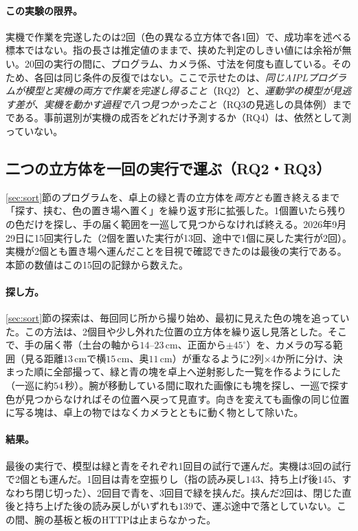 \documentclass[10pt,letterpaper]{article}
\begin{document}
\paragraph{この実験の限界。}実機で作業を完遂したのは2回（色の異なる立方体で各1回）で、成功率を述べる標本ではない。指の長さは推定値のままで、挟めた判定のしきい値には余裕が無い。20回の実行の間に、プログラム、カメラ係、寸法を何度も直している。そのため、各回は同じ条件の反復ではない。ここで示せたのは、\emph{同じAIPLプログラムが模型と実機の両方で作業を完遂し得ること}（RQ2）と、\emph{運動学の模型が見逃す差が、実機を動かす過程で八つ見つかったこと}（RQ3の見逃しの具体例）までである。事前選別が実機の成否をどれだけ予測するか（RQ4）は、依然として測っていない。

\subsection{二つの立方体を一回の実行で運ぶ（RQ2・RQ3）}\label{sec:sort2}
\ref{sec:sort}節のプログラムを、卓上の緑と青の立方体を\emph{両方とも}置き終えるまで「探す、挟む、色の置き場へ置く」を繰り返す形に拡張した。1個置いたら残りの色だけを探し、手の届く範囲を一巡して見つからなければ終える。2026年9月29日に15回実行した（2個を置いた実行が13回、途中で1個に戻した実行が2回）。実機が2個とも置き場へ運んだことを目視で確認できたのは最後の実行である。本節の数値はこの15回の記録から数えた。

\paragraph{探し方。}\ref{sec:sort}節の探索は、毎回同じ所から撮り始め、最初に見えた色の塊を追っていた。この方法は、2個目や少し外れた位置の立方体を繰り返し見落とした。そこで、手の届く帯（土台の軸から$14$--$23$\,cm、正面から$\pm45^{\circ}$）を、カメラの写る範囲（見る距離$13$\,cmで横$15$\,cm、奥$11$\,cm）が重なるように2列×4か所に分け、決まった順に全部撮って、緑と青の塊を卓上へ逆射影した一覧を作るようにした（一巡に約$54$\,秒）。腕が移動している間に取れた画像にも塊を探し、一巡で探す色が見つからなければその位置へ戻って見直す。向きを変えても画像の同じ位置に写る塊は、卓上の物ではなくカメラとともに動く物として除いた。

\paragraph{結果。}最後の実行で、模型は緑と青をそれぞれ1回目の試行で運んだ。実機は3回の試行で2個とも運んだ。1回目は青を空振りし（指の読み戻し$143$、持ち上げ後$145$、すなわち閉じ切った）、2回目で青を、3回目で緑を挟んだ。挟んだ2回は、閉じた直後と持ち上げた後の読み戻しがいずれも$139$で、運ぶ途中で落としていない。この間、腕の基板と板のHTTPは止まらなかった。
\end{document}
